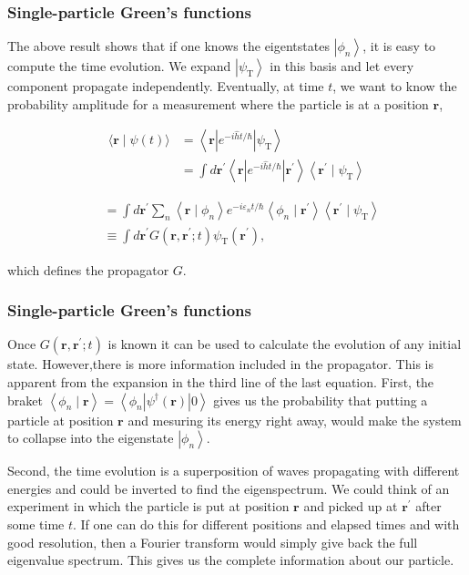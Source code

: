 \documentclass[compress]{beamer}
\begin{document}
\frame
{
\frametitle{Single-particle Green's functions}
\begin{small}
{\scriptsize

The above result shows that if one knows the eigentstates
$\left|\phi_{n}\right\rangle$, it is easy to compute the
time evolution. We expand $\left|\psi_{\mathrm{T}}\right\rangle$ in this
basis and let every component propagate independently. Eventually, at
time $t$, we want to know the probability amplitude for a  measurement
where  the particle is at a position $\mathbf{r}$,

$$
\begin{aligned}
\langle\mathbf{r} \mid \psi(t)\rangle & =\left\langle\mathbf{r}\left|e^{-i \hat{h} t / \hbar}\right| \psi_{\mathrm{T}}\right\rangle \\
& =\int d \mathbf{r}^{\prime}\left\langle\mathbf{r}\left|e^{-i \hat{h} t / \hbar}\right| \mathbf{r}^{\prime}\right\rangle\left\langle\mathbf{r}^{\prime} \mid \psi_{\mathrm{T}}\right\rangle
\end{aligned}
$$

$$
\begin{aligned}
& =\int d \mathbf{r}^{\prime} \sum_{n}\left\langle\mathbf{r} \mid \phi_{n}\right\rangle e^{-i \varepsilon_{n} t / \hbar}\left\langle\phi_{n} \mid \mathbf{r}^{\prime}\right\rangle\left\langle\mathbf{r}^{\prime} \mid \psi_{\mathrm{T}}\right\rangle \\
& \equiv \int d \mathbf{r}^{\prime} G\left(\mathbf{r}, \mathbf{r}^{\prime} ; t\right) \psi_{\mathrm{T}}\left(\mathbf{r}^{\prime}\right),
\end{aligned}
$$

which defines the propagator $G$.
}
\end{small}
}


\frame
{
\frametitle{Single-particle Green's functions}
\begin{small}
{\scriptsize
 Once $G\left(\mathbf{r}, \mathbf{r}^{\prime} ; t\right)$
 is known it can be used to calculate the evolution of any initial
 state. However,there is more information included in the
 propagator. This is apparent from the expansion in the third line of the last equation.
 First, the braket $\left\langle\phi_{n} \mid
 \mathbf{r}\right\rangle=\left\langle\phi_{n}\left|\psi^{\dagger}(\mathbf{r})\right|
 0\right\rangle$ gives us the probability that putting a particle at
 position $\mathbf{r}$ and mesuring its energy right away, would make
 the system to collapse into the eigenstate
 $\left|\phi_{n}\right\rangle$.

 Second, the time evolution is a
 superposition of waves propagating with different energies and could
 be inverted to find the eigenspectrum. We could think of  an experiment in
 which the particle is put at position $\mathbf{r}$ and picked up at
 $\mathbf{r}^{\prime}$ after some time $t$. If one can do this for
 different positions and elapsed times and with good resolution, then a
 Fourier transform would simply give back the full eigenvalue
 spectrum. This  gives us the complete information about our particle.

}
\end{small}
}
\end{document}
